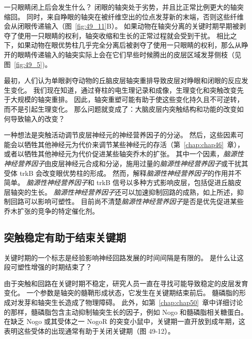 一只眼睛闭上后会发生什么？
闭眼的轴突处于劣势，并且比正常比例更大的轴突缩回。
同时，来自睁眼的轴突在被纤维空出的位点发芽新的末端，否则这些纤维会从闭眼传递输入（图~\ref{fig:49_11}B）。
如果动物在轴突分离的关键时期早期被剥夺了使用一只眼睛的权利，轴突收缩和生长的正常过程就会受到干扰。
相比之下，如果动物在眼优势柱几乎完全分离后被剥夺了使用一只眼睛的权利，那么从睁开的眼睛传递输入的轴突实际上会在它们早些时候腾出的皮层区域发芽侧枝（见图~\ref{fig:49_5})。


最初，人们认为单眼剥夺动物的丘脑皮层轴突重排导致皮层对睁眼和闭眼的反应发生变化。
我们现在知道，通过脊柱的电生理记录和成像，生理变化和突触改变先于大规模的轴突重排。
因此，轴突重塑可能有助于使这些变化持久且不可逆转，而不是引起生理变化。
那么问题就变成了：大脑皮层内突触结构和功能的改变如何导致输入的改变？


一种想法是突触活动调节皮层神经元的神经营养因子的分泌。
然后，这些因素可能会以牺牲其他神经元为代价来调节某些神经元的存活（第~\ref{chap:chap46}~章），或者以牺牲其他神经元为代价促进某些轴突乔木的扩张。
其中一个因素，\textit{脑源性神经营养因子}由皮层神经元合成和分泌，施用过量的\textit{脑源性神经营养因子}或干扰其受体 trkB 会改变眼优势柱的形成。
然而，解释\textit{脑源性神经营养因子}的作用并不简单。
\textit{脑源性神经营养因子}和 trkB 信号以多种方式影响皮层，包括促进丘脑皮层轴突的生长。
\textit{脑源性神经营养因子}还可以加速抑制回路的成熟，如上所述，抑制回路可以影响可塑性。
目前尚不清楚\textit{脑源性神经营养因子}是否是优先促进某些乔木扩张的竞争的特定催化剂。



\subsection{突触稳定有助于结束关键期}

关键时期的一个标志是经验影响神经回路发展的时间间隔是有限的。 是什么让这段可塑性增强的时期结束了？


由于突触和回路在关键时期不稳定，研究人员一直在寻找可能导致稳定的皮层发育变化。
一个参数是轴突的髓鞘形成状态，它发生在关键期结束前后。
髓磷脂的形成对发芽和轴突生长造成了物理障碍。
此外，如第~\ref{chap:chap50}~章中详细讨论的那样，髓磷脂包含主动抑制轴突生长的因子，例如 Nogo 和髓磷脂相关糖蛋白。 
在缺乏 Nogo 或其受体之一 NogoR 的突变小鼠中，关键期一直开放到成年期，这表明这些受体的出现通常有助于关闭关键期（图 49-12）。


